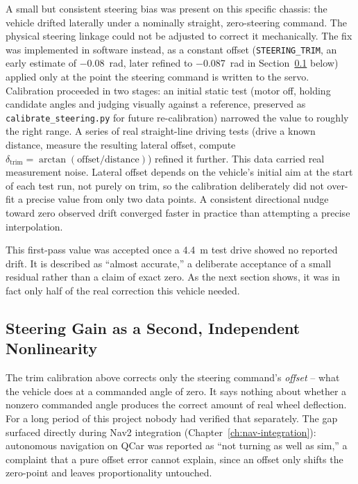A small but consistent steering bias was present on this specific
chassis: the vehicle drifted laterally under a nominally straight,
zero-steering command. The physical steering linkage
could not be adjusted to correct it mechanically. The fix was
implemented in software instead, as a constant offset
(\texttt{STEERING\_TRIM}, an early estimate of \SI{-0.08}{\radian},
later refined to \SI{-0.087}{\radian} in
Section~\ref{sec:steering-gain} below) applied only at the point the
steering command is written to the servo. Calibration proceeded in
two stages: an initial static test (motor off, holding candidate
angles and judging visually against a reference, preserved as
\texttt{calibrate\_steering.py} for future re-calibration) narrowed
the value to roughly the right range. A series of real
straight-line driving tests (drive a known distance, measure the
resulting lateral offset, compute
$\delta_{\text{trim}} = \arctan(\text{offset}/\text{distance})$)
refined it further. This data carried real measurement noise. Lateral offset depends on
the vehicle's initial aim at the start of each test run, not purely
on trim, so the calibration deliberately did not over-fit a precise
value from only two data points. A
consistent directional nudge toward zero observed drift converged
faster in practice than attempting a precise interpolation.

This first-pass value was accepted once a \SI{4.4}{\meter} test drive
showed no reported drift. It is described as ``almost accurate,'' a
deliberate acceptance of a small residual rather than a claim of
exact zero. As the next section shows, it was in fact only half of
the real correction this vehicle needed.

\subsection{Steering Gain as a Second, Independent Nonlinearity}
\label{sec:steering-gain}

The trim calibration above corrects only the steering command's
\emph{offset} -- what the vehicle does at a commanded angle of zero.
It says nothing about whether a nonzero commanded angle produces the
correct amount of real wheel deflection. For a long period of
this project nobody had verified that separately. The gap surfaced
directly during Nav2 integration (Chapter~\ref{ch:nav-integration}):
autonomous navigation on QCar was reported as ``not turning as well
as sim,'' a complaint that a pure
offset error cannot explain, since an offset only shifts the
zero-point and leaves proportionality untouched.

